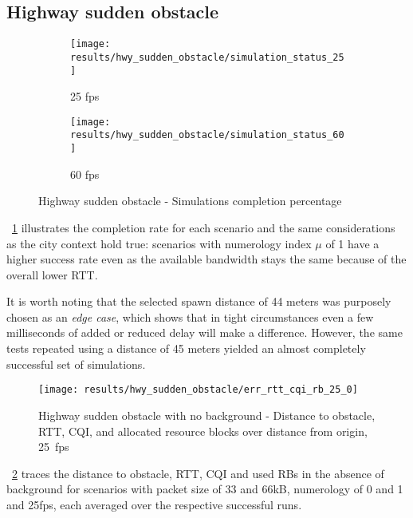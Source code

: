 \pagebreak

\subsection{Highway sudden obstacle}

\begin{figure}[H]
    \centering
    \begin{subfigure}[b]{0.95\textwidth}
        \centering
        \texttt{[image: results/hwy\_sudden\_obstacle/simulation\_status\_25]}
        \caption{25 fps}
    \end{subfigure}
    \hfill
    \begin{subfigure}[b]{0.95\textwidth}
        \centering
        \texttt{[image: results/hwy\_sudden\_obstacle/simulation\_status\_60]}
        \caption{60 fps}
    \end{subfigure}
    \caption{Highway sudden obstacle - Simulations completion percentage}
    \label{fig:hwy_sudden_obstacle_completion_percentage}
\end{figure}

\figurename~\ref{fig:hwy_sudden_obstacle_completion_percentage} illustrates the completion rate for each scenario and the same considerations as the city context hold true: scenarios with numerology index $\mu$ of 1 have a higher success rate even as the available bandwidth stays the same because of the overall lower RTT.

It is worth noting that the selected spawn distance of 44 meters was purposely chosen as an \textit{edge case}, which shows that in tight circumstances even a few milliseconds of added or reduced delay will make a difference. However, the same tests repeated using a distance of 45 meters yielded an almost completely successful set of simulations.

\begin{figure}[H]
    \centering
    \texttt{[image: results/hwy\_sudden\_obstacle/err\_rtt\_cqi\_rb\_25\_0]}
    \caption{Highway sudden obstacle with no background - Distance to obstacle, RTT, CQI, and allocated resource blocks over distance from origin, 25~fps}
    \label{fig:hwy_sudden_obstacle_err_rtt_cqi_rb_25_0}
\end{figure}

\figurename~\ref{fig:hwy_sudden_obstacle_err_rtt_cqi_rb_25_0} traces the distance to obstacle, RTT, CQI and used RBs in the absence of background for scenarios with packet size of 33 and 66kB, numerology of 0 and 1 and 25fps, each averaged over the respective successful runs.

